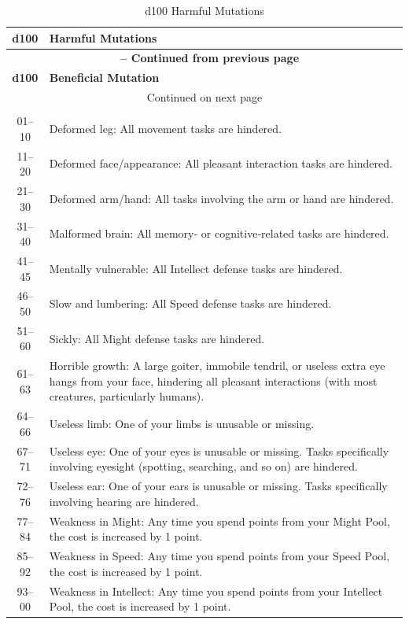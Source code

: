 \begin{longtable}{| c | p{15cm} |}
    \caption{d100 Harmful Mutations} \\
    \hline
    \textbf{d100} & \textbf{Harmful Mutations} \\
    \hline
    \endfirsthead

    \multicolumn{2}{c}{\textbf{\tablename\ \thetable{} -- Continued from previous page}} \\
    \hline
    \textbf{d100} & \textbf{Beneficial Mutation} \\
    \hline
    \endhead

    \hline
    \multicolumn{2}{|c|}{Continued on next page} \\
    \hline
    \endfoot

    \hline
    \multicolumn{2}{|c|}{End of Table} \\
    \hline
    \endlastfoot


01–10 & Deformed leg: All movement tasks are hindered. \\ \hline 
11–20 & Deformed face/appearance: All pleasant interaction tasks are hindered. \\ \hline 
21–30 & Deformed arm/hand: All tasks involving the arm or hand are hindered. \\ \hline 
31–40 & Malformed brain: All memory‑ or cognitive‑related tasks are hindered. \\ \hline 
41–45 & Mentally vulnerable: All Intellect defense tasks are hindered. \\ \hline 
46–50 & Slow and lumbering: All Speed defense tasks are hindered. \\ \hline 
51–60 & Sickly: All Might defense tasks are hindered. \\ \hline 
61–63 & Horrible growth: A large goiter, immobile tendril, or useless extra eye hangs from your face, hindering all pleasant interactions (with most creatures, particularly humans). \\ \hline 
64–66 & Useless limb: One of your limbs is unusable or missing. \\ \hline 
67–71 & Useless eye: One of your eyes is unusable or missing. Tasks specifically involving eyesight (spotting, searching, and so on) are hindered. \\ \hline 
72–76 & Useless ear: One of your ears is unusable or missing. Tasks specifically involving hearing are hindered. \\ \hline 
77–84 & Weakness in Might: Any time you spend points from your Might Pool, the cost is increased by 1 point. \\ \hline 
85–92 & Weakness in Speed: Any time you spend points from your Speed Pool, the cost is increased by 1 point. \\ \hline 
93–00 & Weakness in Intellect: Any time you spend points from your Intellect Pool, the cost is increased by 1 point. \\ \hline 

\end{longtable}

